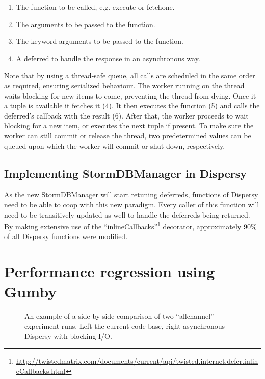 \begin{enumerate}
	\item The function to be called, e.g. execute or fetchone.
	\item The arguments to be passed to the function.
	\item The keyword arguments to be passed to the function.
	\item A deferred to handle the response in an asynchronous way.
\end{enumerate}

Note that by using a thread-safe queue, all calls are scheduled in the same order as required, ensuring serialized behaviour.
The worker running on the thread waits blocking for new items to come, preventing the thread from dying.
Once it a tuple is available it fetches it (4).
It then executes the function (5) and calls the deferred's callback with the result (6).
After that, the worker proceeds to wait blocking for a new item, or executes the next tuple if present.
To make sure the worker can still commit or release the thread, two predetermined values can be queued upon which the worker will commit or shut down, respectively.

\subsection{Implementing StormDBManager in Dispersy}

As the new StormDBManager will start retuning deferreds, functions of Dispersy need to be able to coop with this new paradigm.
Every caller of this function will need to be transitively updated as well to handle the deferreds being returned.
By making extensive use of the \enquote{inlineCallbacks}\footnote{\url{http://twistedmatrix.com/documents/current/api/twisted.internet.defer.inlineCallbacks.html}} decorator, approximately 90\% of all Dispersy functions were modified. 

\section{Performance regression using Gumby}

\begin{figure}[h]
	\caption{An example of a side by side comparison of two \enquote{allchannel} experiment runs. Left the current code base, right asynchronous Dispersy with blocking I/O.}
	\label{fig:side_by_side_send}
\end{figure} 

